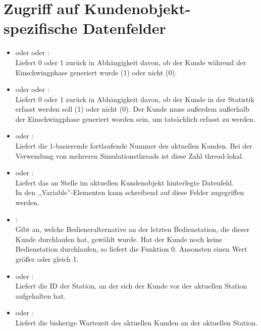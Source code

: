 \section{Zugriff auf Kundenobjekt-spezifische Datenfelder}

\begin{itemize}

\item
{} oder  oder :\\
Liefert 0 oder 1 zurück in Abhängigkeit davon, ob der Kunde während der Einschwingphase generiert wurde (1) oder nicht (0).

\item
{} oder  oder :\\
Liefert 0 oder 1 zurück in Abhängigkeit davon, ob der Kunde in der Statistik erfasst werden soll (1) oder nicht (0). Der Kunde muss außerdem außerhalb der Einschwingphase generiert worden sein, um tatsächlich erfasst zu werden.

\item
{} oder :\\
Liefert die 1-basierende fortlaufende Nummer des aktuellen Kunden. Bei der Verwendung von mehreren Simulationsthreads ist diese Zahl thread-lokal.

\item
{} oder :\\
Liefert das an Stelle  im aktuellen Kundenobjekt hinterlegte Datenfeld.\\
In den ,,Variable''-Elementen kann schreibend auf diese Felder zugegriffen werden.

\item
{}:\\
Gibt an, welche Bedieneralternative an der letzten Bedienstation, die dieser Kunde durchlaufen hat, gewählt wurde. Hat der Kunde noch keine Bedienstation durchlaufen, so liefert die Funktion 0. Ansonsten einen Wert größer oder gleich 1.

\item
{} oder :\\
Liefert die ID der Station, an der sich der Kunde vor der aktuellen Station aufgehalten hat.

\item
{} oder :\\
Liefert die bisherige Wartezeit des aktuellen Kunden an der aktuellen Station.

\end{itemize}



